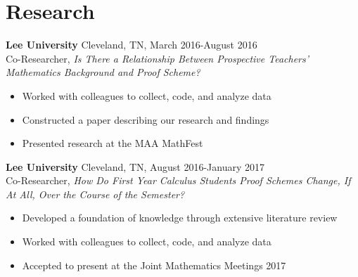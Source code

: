 \section{\sc Research}

{\bf Lee University} Cleveland, TN, March 2016-August 2016\\
Co-Researcher, \textit{Is There a Relationship Between Prospective Teachers' Mathematics Background and Proof Scheme?}
\begin{itemize}
\setlength\itemsep{0em}
\item Worked with colleagues to collect, code, and analyze data
\item Constructed a paper describing our research and findings
\item Presented research at the MAA MathFest
\end{itemize}

{\bf Lee University} Cleveland, TN, August 2016-January 2017\\
Co-Researcher, \textit{How Do First Year Calculus Students Proof Schemes Change, If At All, Over the Course of the Semester?}
\begin{itemize}
\setlength\itemsep{0em}
\item Developed a foundation of knowledge through extensive literature review
\item Worked with colleagues to collect, code, and analyze data
\item Accepted to present at the Joint Mathematics Meetings 2017

\end{itemize}

\endinput